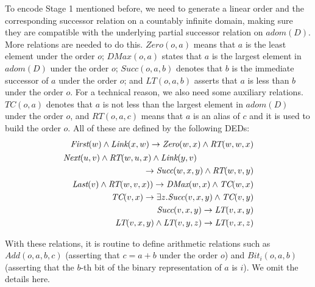 \documentclass[letterpaper]{article} %
\theoremstyle{definition}
\theoremstyle{remark}
\theoremstyle{definition}
\begin{document}
To encode Stage 1 mentioned before, we need to generate a linear order and the corresponding successor relation on a countably infinite domain, making sure they are compatible with the underlying partial successor relation on $adom(D)$.
More relations are needed to do this. $\textit{Zero}(o,a)$ means that $a$ is the least element under the order $o$; $\textit{DMax}(o,a)$ states that $a$ is the largest element in $adom(D)$ under the order $o$; $\textit{Succ}(o,a,b)$ denotes that $b$ is the immediate successor of $a$ under the order $o$; and $\textit{LT}(o,a,b)$ asserts that $a$ is less than $b$ under the order $o$. For a technical reason, we also need some auxiliary relations. $\textit{TC}(o,a)$ denotes that $a$ is not less than the largest element in $adom(D)$ under the order $o$, and $\textit{RT}(o,a,c)$ means that $a$ is an alias of $c$ and it is used to build the order $o$.
All of these are defined by the following DEDs:
\begin{eqnarray}
\textit{First}(w)\wedge\textit{Link}(x,w)\rightarrow\textit{Zero}(w,x)\wedge\textit{RT}(w,w,x)\\
\begin{aligned}
\textit{Next}(u,v)\wedge\textit{RT}(w,u,\hspace{0.06cm}&x)\wedge\textit{Link}(y,v)\\
&\rightarrow\textit{Succ}(w,x,y)\wedge\textit{RT}(w,v,y)
\end{aligned}\\
\textit{Last}(v)\wedge\textit{RT}(w,v,x))\rightarrow\textit{DMax}(w,x)\wedge\textit{TC}(w,x)\\
\textit{TC}(v,x)\rightarrow\exists z.\textit{Succ}(v,x,y)\wedge\textit{TC}(v,y)\\
\textit{Succ}(v,x,y)\rightarrow\textit{LT}(v,x,y)\\
\textit{LT}(v,x,y)\wedge\textit{LT}(v,y,z)\rightarrow\textit{LT}(v,x,z)
\end{eqnarray}

With these relations, it is routine to define arithmetic relations such as $\textit{Add}(o,a,b,c)$ (asserting that $c=a+b$ under the order $o$) and $\textit{Bit}_i(o,a,b)$ (asserting that the $b$-th bit of the binary representation of $a$ is $i$). We omit the details here. 
\end{document}
